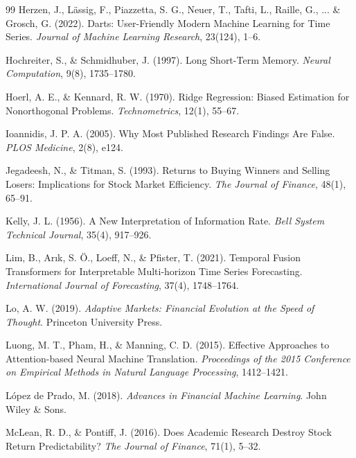 \documentclass[11pt,a4paper]{article}
\begin{document}
\begin{thebibliography}{99}
Herzen, J., Lässig, F., Piazzetta, S. G., Neuer, T., Tafti, L., Raille, G., ... \& Grosch, G. (2022).
\newblock Darts: User-Friendly Modern Machine Learning for Time Series.
\newblock \textit{Journal of Machine Learning Research}, 23(124), 1--6.

Hochreiter, S., \& Schmidhuber, J. (1997).
\newblock Long Short-Term Memory.
\newblock \textit{Neural Computation}, 9(8), 1735--1780.

Hoerl, A. E., \& Kennard, R. W. (1970).
\newblock Ridge Regression: Biased Estimation for Nonorthogonal Problems.
\newblock \textit{Technometrics}, 12(1), 55--67.

Ioannidis, J. P. A. (2005).
\newblock Why Most Published Research Findings Are False.
\newblock \textit{PLOS Medicine}, 2(8), e124.

Jegadeesh, N., \& Titman, S. (1993).
\newblock Returns to Buying Winners and Selling Losers: Implications for Stock Market Efficiency.
\newblock \textit{The Journal of Finance}, 48(1), 65--91.

Kelly, J. L. (1956).
\newblock A New Interpretation of Information Rate.
\newblock \textit{Bell System Technical Journal}, 35(4), 917--926.

Lim, B., Arık, S. Ö., Loeff, N., \& Pfister, T. (2021).
\newblock Temporal Fusion Transformers for Interpretable Multi-horizon Time Series Forecasting.
\newblock \textit{International Journal of Forecasting}, 37(4), 1748--1764.

Lo, A. W. (2019).
\newblock \textit{Adaptive Markets: Financial Evolution at the Speed of Thought}.
\newblock Princeton University Press.

Luong, M. T., Pham, H., \& Manning, C. D. (2015).
\newblock Effective Approaches to Attention-based Neural Machine Translation.
\newblock \textit{Proceedings of the 2015 Conference on Empirical Methods in Natural Language Processing}, 1412--1421.

López de Prado, M. (2018).
\newblock \textit{Advances in Financial Machine Learning}.
\newblock John Wiley \& Sons.

McLean, R. D., \& Pontiff, J. (2016).
\newblock Does Academic Research Destroy Stock Return Predictability?
\newblock \textit{The Journal of Finance}, 71(1), 5--32.


\end{thebibliography}
\end{document}
